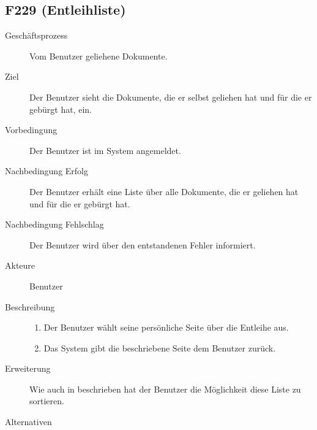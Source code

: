 \subsection{F229 (Entleihliste)}
\begin{description}
  \item[Geschäftsprozess]Vom Benutzer geliehene Dokumente.
  \item[Ziel]Der Benutzer sieht die Dokumente, die er selbst geliehen hat und für die er gebürgt hat, ein.
  \item[Vorbedingung]Der Benutzer ist im System angemeldet.
  \item[Nachbedingung Erfolg]Der Benutzer erhält eine Liste über alle Dokumente, die er geliehen hat und für die er gebürgt hat.
  \item[Nachbedingung Fehlschlag]Der Benutzer wird über den entstandenen Fehler informiert.
  \item[Akteure]Benutzer
  \item[Beschreibung]\hfill
    \begin{enumerate}
      \item Der Benutzer wählt seine persönliche Seite über die Entleihe aus.
      \item Das System gibt die beschriebene Seite dem Benutzer zurück.
    \end{enumerate}
  \item[Erweiterung]Wie auch in  beschrieben hat der Benutzer die Möglichkeit diese Liste zu sortieren.
  \item[Alternativen]
\end{description}

